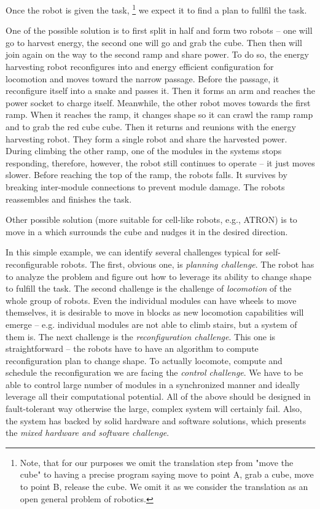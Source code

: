 Once the robot is given the task, \footnote{Note, that for our purposes we omit
the translation step from "move the cube" to having a precise program saying
move to point A, grab a cube, move to point B, release the cube. We omit it as
we consider the translation as an open general problem of robotics.} we expect
it to find a plan to fullfil the task.

One of the possible solution is to first split in half and form two robots --
one will go to harvest energy, the second one will go and grab the cube. Then
then will join again on the way to the second ramp and share power. To do so,
the energy harvesting robot reconfigures into and energy efficient configuration
for locomotion and moves toward the narrow passage. Before the passage, it
reconfigure itself into a snake and passes it. Then it forms an arm and reaches
the power socket to charge itself. Meanwhile, the other robot moves towards the
first ramp. When it reaches the ramp, it changes shape so it can crawl the ramp
ramp and to grab the red cube cube. Then it returns and reunions with the energy
harvesting robot. They form a single robot and share the harvested power. During
climbing the other ramp, one of the modules in the systems stops responding,
therefore, however, the robot still continues to operate -- it just moves
slower. Before reaching the top of the ramp, the robots falls. It survives by
breaking inter-module connections to prevent module damage. The robots
reassembles and finishes the task.

Other possible solution (more suitable for cell-like robots, e.g., ATRON) is to
move in a  which surrounds the cube and nudges it in
the desired direction.

In this simple example, we can identify several challenges typical for
self-reconfigurable robots. The first, obvious one, is \emph{planning
challenge}. The robot has to analyze the problem and figure out how to leverage
its ability to change shape to fulfill the task. The second challenge is the
challenge of \emph{locomotion} of the whole group of robots. Even the individual
modules can have wheels to move themselves, it is desirable to move in blocks as
new locomotion capabilities will emerge -- e.g. individual modules are not able
to climb stairs, but a system of them is. The next challenge is the
\emph{reconfiguration challenge}. This one is straightforward -- the robots have
to have an algorithm to compute reconfiguration plan to change shape. To
actually locomote, compute and schedule the reconfiguration we are facing the
\emph{control challenge}. We have to be able to control large number of modules
in a synchronized manner and ideally leverage all their computational potential.
All of the above should be designed in fault-tolerant way otherwise the large,
complex system will certainly fail. Also, the system has backed by solid
hardware and software solutions, which presents the \emph{mixed hardware and
software challenge}.

